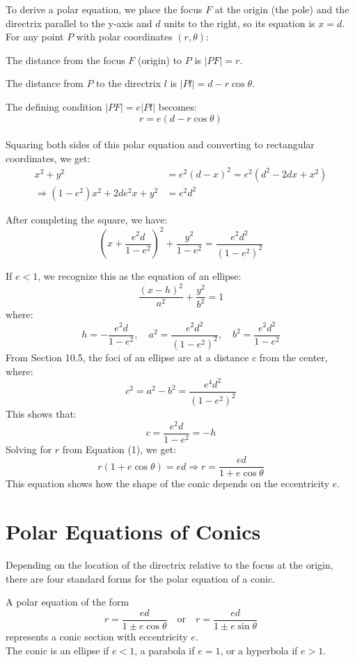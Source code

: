 \documentclass{article}
\begin{document}
To derive a polar equation, we place the focus $F$ at the origin (the pole) and the directrix parallel to the y-axis and $d$ units to the right, so its equation is $x=d$. 
\\For any point $P$ with polar coordinates $(r, \theta)$:

The distance from the focus $F$ (origin) to $P$ is $|PF| = r$.

The distance from $P$ to the directrix $l$ is $|Pl| = d - r \cos\theta$.

The defining condition $|PF| = e|Pl|$ becomes:
\begin{equation*}
r = e(d - r \cos\theta)
\end{equation*}
\\

Squaring both sides of this polar equation and converting to rectangular coordinates, we get:
\begin{align*}
    x^2 + y^2 &= e^2(d - x)^2 = e^2(d^2 - 2dx + x^2) \\
    \Rightarrow (1 - e^2)x^2 + 2de^2x + y^2 &= e^2d^2
\end{align*}

After completing the square, we have:
\[
\left(x + \frac{e^2d}{1 - e^2}\right)^2 + \frac{y^2}{1 - e^2} = \frac{e^2d^2}{(1 - e^2)^2}
\]

If $e < 1$, we recognize this as the equation of an ellipse:
\[
\frac{(x - h)^2}{a^2} + \frac{y^2}{b^2} = 1
\]
where:
\[
h = -\frac{e^2d}{1 - e^2}, \quad a^2 = \frac{e^2d^2}{(1 - e^2)^2}, \quad b^2 = \frac{e^2d^2}{1 - e^2}
\]
From Section 10.5, the foci of an ellipse are at a distance $c$ from the center, where:
\[
c^2 = a^2 - b^2 = \frac{e^4d^2}{(1 - e^2)^2}
\]
This shows that:
\[
c = \frac{e^2d}{1 - e^2} = -h
\]
Solving for $r$ from Equation (1), we get:
\[
r(1 + e \cos\theta) = ed \Rightarrow r = \frac{ed}{1 + e \cos\theta}
\]
This equation shows how the shape of the conic depends on the eccentricity $e$.

\section*{Polar Equations of Conics}
Depending on the location of the directrix relative to the focus at the origin, there are four standard forms for the polar equation of a conic.

\begin{tcolorbox}[
    colback=white!,   %
    colframe=orange!80!white, %
    title=Conics Defined by polar coordinates,   %
    boxrule=0.5mm,          %
    arc=3mm               %
    ]
    A polar equation of the form
    \[
    r = \frac{ed}{1 \pm e \cos\theta} \quad \text{or} \quad r = \frac{ed}{1 \pm e \sin\theta}
    \]
    represents a conic section with eccentricity $e$.\\ 
    The conic is an ellipse if $e < 1$, a parabola if $e = 1$, or a hyperbola if $e > 1$.
\end{tcolorbox}
\end{document}
